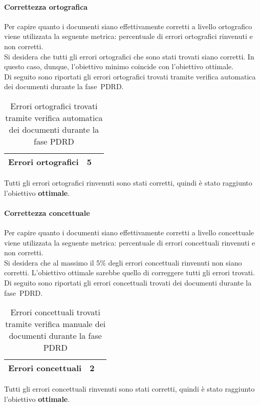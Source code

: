 \documentclass[../PianoDiQualifica.tex]{subfiles}
\begin{document}
\begin{appendices}
			\paragraph{Correttezza ortografica}
			Per capire quanto i documenti siano effettivamente corretti a livello ortografico viene utilizzata la seguente metrica: percentuale di errori ortografici rinvenuti e non corretti.\\
			Si desidera che tutti gli errori ortografici che sono stati trovati siano corretti. In questo caso, dunque, l'obiettivo minimo coincide con l'obiettivo ottimale.\\
			Di seguito sono riportati gli errori ortografici trovati tramite verifica automatica dei documenti durante la fase\g\ PDRD.
			\begin{table}[H]
				\centering
				\begin{tabular}{l * {2}{c}}
					\midrule
					Errori ortografici & 5 \\
					\midrule
				\end{tabular}
				\caption{Errori ortografici trovati tramite verifica automatica dei documenti durante la fase PDRD}
				\label{tab:errori_automatica}
			\end{table}
			Tutti gli errori ortografici rinvenuti sono stati corretti, quindi è stato raggiunto l'obiettivo \textbf{ottimale}.
			
			\paragraph{Correttezza concettuale}
			Per capire quanto i documenti siano effettivamente corretti a livello concettuale viene utilizzata la seguente metrica: percentuale di errori concettuali rinvenuti e non corretti.\\
			Si desidera che al massimo il 5\% degli errori concettuali rinvenuti non siano corretti. L'obiettivo ottimale sarebbe quello di correggere tutti gli errori trovati. \\
			Di seguito sono riportati gli errori concettuali trovati dei documenti durante la fase\g\ PDRD.
			\begin{table}[H]
				\centering
				\begin{tabular}{l * {2}{c}}
					\midrule
					Errori concettuali & 2 \\
					\midrule
				\end{tabular}
				\caption{Errori concettuali trovati tramite verifica manuale dei documenti durante la fase PDRD}
				\label{tab:errori_concettuali}
			\end{table}
			Tutti gli errori concettuali rinvenuti sono stati corretti, quindi è stato raggiunto l'obiettivo \textbf{ottimale}.
			

\end{appendices}
\end{document}
